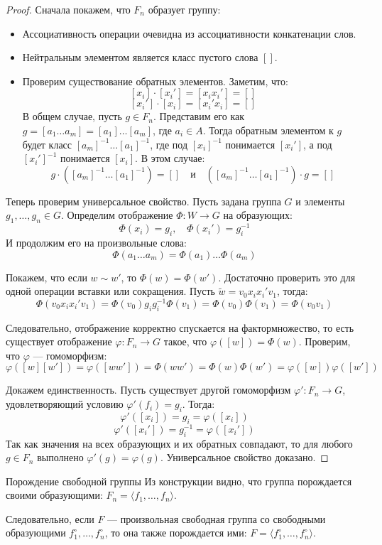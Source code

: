 \begin{proof}
	Сначала покажем, что $F_n$ образует группу:
	\begin{itemize}
		\item Ассоциативность операции очевидна из ассоциативности конкатенации слов.
		\item Нейтральным элементом является класс пустого слова $[]$.
		\item Проверим существование обратных элементов. Заметим, что:
		\[ [x_i] \cdot [x_i'] = [x_i x_i'] = [] \]
		\[ [x_i'] \cdot [x_i] = [x_i' x_i] = [] \]
		В общем случае, пусть $g \in F_n$. Представим его как $g = [a_1 \dots a_m] = [a_1] \dots [a_m]$, где $a_i \in A$. Тогда обратным элементом к $g$ будет класс $[a_m]^{-1} \dots [a_1]^{-1}$, где под $[x_i]^{-1}$ понимается $[x_i']$, а под $[x_i']^{-1}$ понимается $[x_i]$. В этом случае:
		\[ g \cdot \left([a_m]^{-1} \dots [a_1]^{-1}\right) = [] \quad \text{и} \quad \left([a_m]^{-1} \dots [a_1]^{-1}\right) \cdot g = [] \]
	\end{itemize}
	
	Теперь проверим универсальное свойство. Пусть задана группа $G$ и элементы $g_1, \dots, g_n \in G$.
	Определим отображение $\Phi: W \to G$ на образующих:
	\[ \Phi(x_i) = g_i, \quad \Phi(x_i') = g_i^{-1} \]
	И продолжим его на произвольные слова:
	\[ \Phi(a_1 \dots a_m) = \Phi(a_1) \dots \Phi(a_m) \]
	
	Покажем, что если $w \sim w'$, то $\Phi(w) = \Phi(w')$. Достаточно проверить это для одной операции вставки или сокращения. Пусть $\widetilde{w} = v_0 x_i x_i' v_1$, тогда:
	\[ \Phi(v_0 x_i x_i' v_1) = \Phi(v_0) g_i g_i^{-1} \Phi(v_1) = \Phi(v_0)\Phi(v_1) = \Phi(v_0 v_1) \]
	
	Следовательно, отображение корректно спускается на фактормножество, то есть существует отображение $\varphi: F_n \to G$ такое, что $\varphi([w]) = \Phi(w)$.
	Проверим, что $\varphi$ — гомоморфизм:
	\[ \varphi([w][w']) = \varphi([ww']) = \Phi(ww') = \Phi(w)\Phi(w') = \varphi([w])\varphi([w']) \]
	
	Докажем единственность. Пусть существует другой гомоморфизм $\varphi': F_n \to G$, удовлетворяющий условию $\varphi'(f_i) = g_i$. Тогда:
	\[ \varphi'([x_i]) = g_i = \varphi([x_i]) \]
	\[ \varphi'([x_i']) = g_i^{-1} = \varphi([x_i']) \]
	Так как значения на всех образующих и их обратных совпадают, то для любого $g \in F_n$ выполнено $\varphi'(g) = \varphi(g)$. Универсальное свойство доказано.
\end{proof}

\begin{Remark}{Порождение свободной группы}{}
	Из конструкции видно, что группа порождается своими образующими: $F_n = \langle f_1, \dots, f_n \rangle$.
	
	Следовательно, если $F$ — произвольная свободная группа со свободными образующими $f_1^\circ, \dots, f_n^\circ$, то она также порождается ими: $F = \langle f_1^\circ, \dots, f_n^\circ \rangle$.
\end{Remark}

